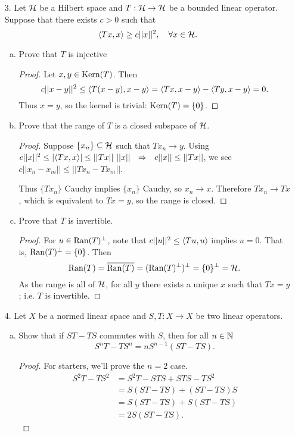 \begin{itemize}
\item[3.] Let $\mathcal{H}$ be a Hilbert space and $T : \mathcal{H} \rightarrow \mathcal{H}$ be a bounded linear operator.
Suppose that there exists $c > 0$ such that 
$$\ip{Tx}{x} \geq c||x||^2, \ \ \ \forall x \in \calh.$$
\begin{enumerate}[(a)]
\item Prove that $T$ is injective
\begin{proof}
Let $x,y \in \operatorname{Kern}(T)$. Then 
$$c||x-y||^2 \leq \langle{}T(x-y),x-y\rangle = \langle{}Tx,x-y\rangle - \langle{}Ty,x-y\rangle = 0.$$ 
Thus $x=y$, so the kernel is trivial: $\operatorname{Kern}(T) = \{0\}$.
\end{proof}

\item Prove that the range of $T$ is a closed subspace of $\mathcal{H}$.
\begin{proof}
Suppose $\{x_n\} \subseteq \mathcal{H}$ such that $Tx_n \rightarrow y$. 
Using $c||x||^2 \leq |\langle{}Tx,x\rangle| \leq ||Tx|| \ ||x|| \ \ \Rightarrow \ \ c||x|| \leq ||Tx||$,
we see $c||x_n - x_m|| \leq ||Tx_n - Tx_m||$. 

Thus $\{Tx_n\}$ Cauchy implies $\{x_n\}$ Cauchy, so $x_n \rightarrow x$. Therefore $Tx_n \rightarrow Tx$, which is equivalent to $Tx = y$, so the range is closed.
\end{proof}

\item Prove that $T$ is invertible.
\begin{proof}
For $u \in \operatorname{Ran}(T)^{\perp}$, note that $c||u||^2 \leq \langle{}Tu,u\rangle$ implies $u=0$. That is, $\operatorname{Ran}(T)^{\perp} = \{0\}$. Then 
$$\operatorname{Ran}(T) = \overline{\operatorname{Ran}(T)} = (\operatorname{Ran}(T)^{\perp})^{\perp} =  \{0\}^{\perp} = \mathcal{H}.$$
As the range is all of $\mathcal{H}$, for all $y$ there exists a unique $x$ such that $Tx=y$; i.e. $T$ is invertible. 
\end{proof}
\end{enumerate}





\item[4.] Let $X$ be a normed linear space and $S, T : X \rightarrow X$ be two linear operators.
\begin{enumerate}[(a)]
\item Show that if $ST - TS$ commutes with $S$, then for all $n \in \mathbb{N}$
$$S^nT - TS^n = nS^{n-1}(ST-TS).$$

\begin{proof}
For starters, we'll prove the $n=2$ case. 
\begin{align*}
    S^2T - TS^2 &= S^2T - STS + STS - TS^2 \\
    &= S(ST - TS) + (ST - TS)S \\
    &= S(ST - TS) + S(ST - TS) \\
    &= 2S(ST - TS).
\end{align*}


\end{proof}
\end{enumerate}
\end{itemize}
